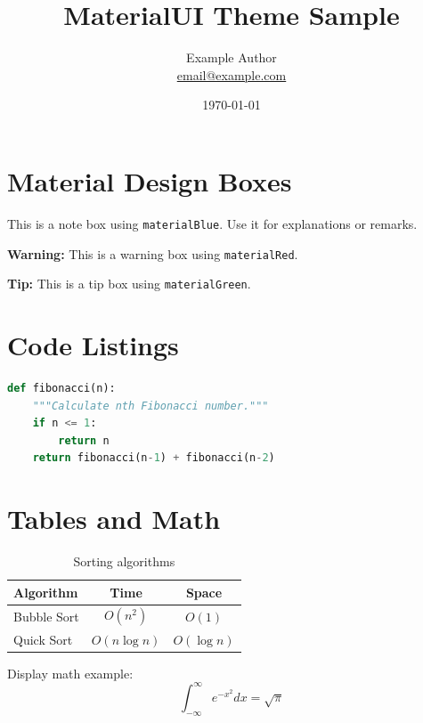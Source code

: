 \documentclass[10pt,a4paper]{article}
\title{MaterialUI Theme Sample}
\author{Example Author \\ \url{email@example.com}}
\date{\today}
\begin{document}
\maketitle
\tableofcontents

\section{Material Design Boxes}

\begin{mdframed}[style=notestyle]
This is a note box using \texttt{materialBlue}. Use it for explanations or remarks.
\end{mdframed}

\begin{mdframed}[style=warningstyle]
\textbf{Warning:} This is a warning box using \texttt{materialRed}.
\end{mdframed}

\begin{mdframed}[style=tipstyle]
\textbf{Tip:} This is a tip box using \texttt{materialGreen}.
\end{mdframed}

\section{Code Listings}

\begin{lstlisting}[language=Python]
def fibonacci(n):
    """Calculate nth Fibonacci number."""
    if n <= 1:
        return n
    return fibonacci(n-1) + fibonacci(n-2)
\end{lstlisting}

\section{Tables and Math}

\begin{table}[h]
\centering
\begin{tabular}{lcc}
\toprule
\textbf{Algorithm} & \textbf{Time} & \textbf{Space} \\
\midrule
Bubble Sort & $O(n^2)$ & $O(1)$ \\
Quick Sort & $O(n \log n)$ & $O(\log n)$ \\
\bottomrule
\end{tabular}
\caption{Sorting algorithms}
\end{table}

Display math example:
\begin{equation}
    \int_{-\infty}^{\infty} e^{-x^2} dx = \sqrt{\pi}
\end{equation}
\end{document}
